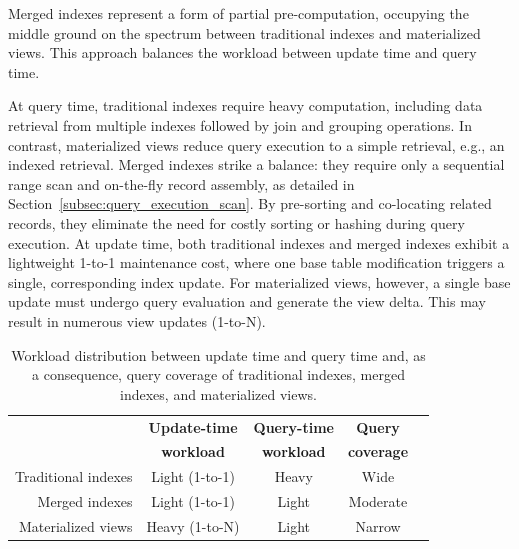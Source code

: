 \documentclass[sigconf, pdfa, nonacm]{acmart}
\begin{document}
Merged indexes represent a form of partial pre-computation, occupying the middle ground on the spectrum between traditional indexes and materialized views. This approach balances the workload between update time and query time.

At query time, traditional indexes require heavy computation, including data retrieval from multiple indexes followed by join and grouping operations. In contrast, materialized views reduce query execution to a simple retrieval, e.g., an indexed retrieval. Merged indexes strike a balance: they require only a sequential range scan and on-the-fly record assembly, as detailed in Section~\ref{subsec:query_execution_scan}. By pre-sorting and co-locating related records, they eliminate the need for costly sorting or hashing during query execution.
At update time, both traditional indexes and merged indexes exhibit a lightweight 1-to-1 maintenance cost, where one base table modification triggers a single, corresponding index update. For materialized views, however, a single base update must undergo query evaluation and generate the view delta. This may result in numerous view updates (1-to-N).

\begin{table}[htbp]
    \centering
    \small
    \caption{Workload distribution between update time and query time and, as a consequence, query coverage of traditional indexes, merged indexes, and materialized views.
    }\label{tab:update-time-vs-query-time}
    \begin{tabular}{r c c c c}
        \toprule
        & \textbf{Update-time} & \textbf{Query-time} & \textbf{Query}\\
        & \textbf{workload} & \textbf{workload} & \textbf{coverage}\\
        \midrule
        Traditional indexes & Light (1-to-1) & Heavy & Wide\\
        Merged indexes & Light (1-to-1) & Light & Moderate \\
        Materialized views & Heavy (1-to-N) & Light & Narrow\\
        \bottomrule
    \end{tabular}
\end{table}
\end{document}
